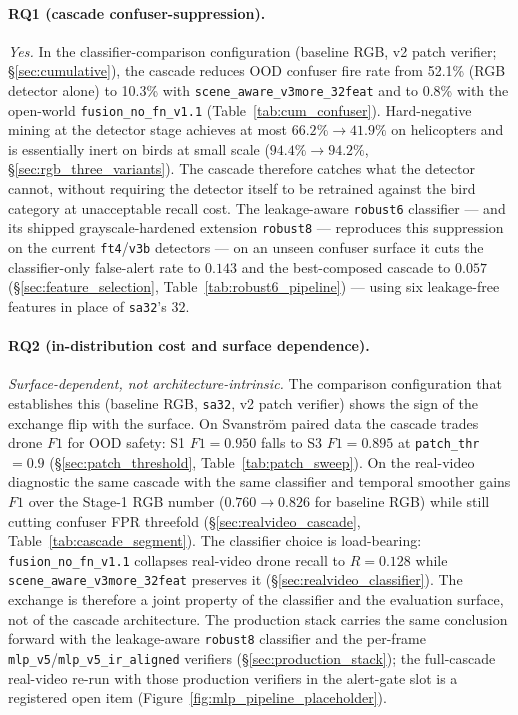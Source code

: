 \documentclass[12pt,a4paper,oneside,openright]{book}
\begin{document}
\paragraph{RQ1 (cascade confuser-suppression).}
\emph{Yes.} In the classifier-comparison configuration (baseline RGB, v2 patch verifier; \S\ref{sec:cumulative}), the cascade reduces OOD confuser fire rate from 52.1\% (RGB detector alone) to 10.3\% with \texttt{scene\_aware\_v3more\_32feat} and to 0.8\% with the open-world \texttt{fusion\_no\_fn\_v1.1} (Table~\ref{tab:cum_confuser}). Hard-negative mining at the detector stage achieves at most $66.2\% \to 41.9\%$ on helicopters and is essentially inert on birds at small scale ($94.4\% \to 94.2\%$, \S\ref{sec:rgb_three_variants}). The cascade therefore catches what the detector cannot, without requiring the detector itself to be retrained against the bird category at unacceptable recall cost. The leakage-aware \texttt{robust6} classifier --- and its shipped grayscale-hardened extension \texttt{robust8} --- reproduces this suppression on the current \texttt{ft4}/\texttt{v3b} detectors --- on an unseen confuser surface it cuts the classifier-only false-alert rate to $0.143$ and the best-composed cascade to $0.057$ (\S\ref{sec:feature_selection}, Table~\ref{tab:robust6_pipeline}) --- using six leakage-free features in place of \texttt{sa32}'s $32$.

\paragraph{RQ2 (in-distribution cost and surface dependence).}
\emph{Surface-dependent, not architecture-intrinsic.} The comparison configuration that establishes this (baseline RGB, \texttt{sa32}, v2 patch verifier) shows the sign of the exchange flip with the surface. On Svanstr\"om paired data the cascade trades drone $F1$ for OOD safety: S1 $F1=0.950$ falls to S3 $F1=0.895$ at \texttt{patch\_thr}$=0.9$ (\S\ref{sec:patch_threshold}, Table~\ref{tab:patch_sweep}). On the real-video diagnostic the same cascade with the same classifier and temporal smoother gains $F1$ over the Stage-1 RGB number ($0.760 \to 0.826$ for baseline RGB) while still cutting confuser FPR threefold (\S\ref{sec:realvideo_cascade}, Table~\ref{tab:cascade_segment}). The classifier choice is load-bearing: \texttt{fusion\_no\_fn\_v1.1} collapses real-video drone recall to $R=0.128$ while \texttt{scene\_aware\_v3more\_32feat} preserves it (\S\ref{sec:realvideo_classifier}). The exchange is therefore a joint property of the classifier and the evaluation surface, not of the cascade architecture. The production stack carries the same conclusion forward with the leakage-aware \texttt{robust8} classifier and the per-frame \texttt{mlp\_v5}/\texttt{mlp\_v5\_ir\_aligned} verifiers (\S\ref{sec:production_stack}); the full-cascade real-video re-run with those production verifiers in the alert-gate slot is a registered open item (Figure~\ref{fig:mlp_pipeline_placeholder}).
\end{document}
